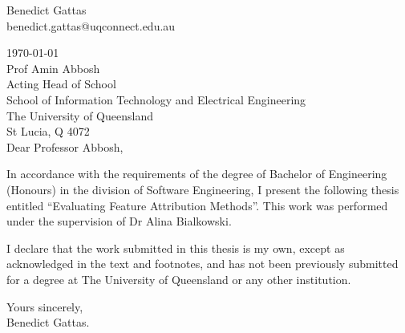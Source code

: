 \documentclass[main]{subfiles}
\begin{document}
\begin{flushright}
	Benedict Gattas\\
	benedict.gattas@uqconnect.edu.au\\
	\medskip
\end{flushright}
\begin{flushleft}
	\today
	\bigskip\bigskip\\
  Prof Amin Abbosh\\
  Acting Head of School\\
  School of Information Technology and Electrical Engineering\\
  The University of Queensland\\
  St Lucia, Q 4072\\
  \bigskip\bigskip
  Dear Professor Abbosh,
\end{flushleft}

In accordance with the requirements of the degree of Bachelor of
Engineering (Honours) in the division of Software Engineering,
I present the following thesis entitled ``Evaluating Feature Attribution Methods''.  
This work was performed under the supervision of Dr Alina Bialkowski.

I declare that the work submitted in this thesis is my own, except as
acknowledged in the text and footnotes, and has not been previously
submitted for a degree at The University of Queensland or any other
institution.

\begin{flushright}
	Yours sincerely,\\
	\medskip
	\medskip
	Benedict Gattas.
\end{flushright}
\end{document}
